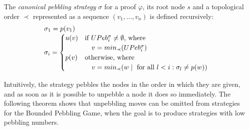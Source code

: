 \begin{definition}
\label{def:canonstrat}
The \emph{canonical pebbling strategy} $\sigma$ for a proof $\varphi$, its root node $s$ and a topological order $\prec$ represented as a sequence $(v_1,\dots,v_n)$ is defined recursively:
$$
\begin{array}{l}
\sigma_1 = p(v_1) \\
\sigma_i = 
	\begin{cases}
		u(v) & \text{if } UPeb^{\sigma}_{i} \neq \emptyset \text{, where} \\
				 & \quad v = min_{\prec}(UPeb^{\sigma}_{i}) \\
		p(v) & \text{otherwise, where } \\
				 & \quad v = min_{\prec}(w \mid \text{ for all } l < i: \sigma_l \neq p(w))
	\end{cases}
\end{array}
$$
\end{definition}
Intuitively, the strategy pebbles the nodes in the order in which they are given, and as soon as it is possible to unpebble a node it does so immediately.
The following theorem shows that unpebbling moves can be omitted from strategies for the Bounded Pebbling Game, when the goal is to produce strategies with low pebbling numbers.

